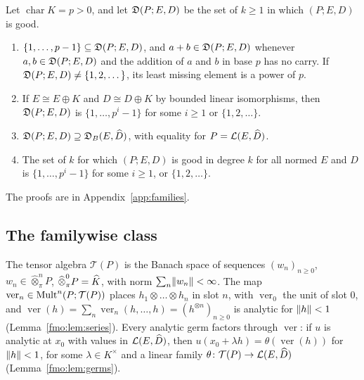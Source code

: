 \begin{corollary}\label{fam2:cor:degrees}
Let $\operatorname{char}K=p>0$, and let $\mathfrak D(P;E,D)$ be the set of $k\ge1$ in which $(P;E,D)$ is good.
\begin{enumerate}
\item $\{1,\dots,p-1\}\subseteq\mathfrak D(P;E,D)$, and $a+b\in\mathfrak D(P;E,D)$ whenever $a,b\in\mathfrak D(P;E,D)$ and the addition of $a$ and
$b$ in base $p$ has no carry. If $\mathfrak D(P;E,D)\ne\{1,2,\dots\}$, its least missing element is a power of $p$.
\item If $E\cong E\oplus K$ and $D\cong D\oplus K$ by bounded linear isomorphisms, then $\mathfrak D(P;E,D)$ is
$\{1,\dots,p^i-1\}$ for some $i\ge1$ or $\{1,2,\dots\}$.
\item $\mathfrak D(P;E,D)\supseteq\mathfrak D_B(E,\widehat D)$, with equality for $P=\mathcal L(E,\widehat D)$.
\item The set of $k$ for which $(P;E,D)$ is good in degree $k$ for all normed $E$ and $D$ is $\{1,\dots,p^i-1\}$ for some
$i\ge1$, or $\{1,2,\dots\}$.
\end{enumerate}
\end{corollary}

The proofs are in Appendix~\ref{app:families}.

\subsection{The familywise class}\label{fam2:ssec:class}

The tensor algebra $\mathcal T(P)$ is the Banach space of sequences $(w_n)_{n\ge0}$, $w_n\in\widehat\otimes^n_\pi P$,
$\widehat\otimes^0_\pi P=\widehat K$, with norm $\sum_n\lVert w_n\rVert<\infty$. The map $\operatorname{ver}_n\in\operatorname{Mult}^n(P;\mathcal T(P))$
places $h_1\otimes\dots\otimes h_n$ in slot $n$, with $\operatorname{ver}_0$ the unit of slot $0$, and
$\operatorname{ver}(h)=\sum_n\operatorname{ver}_n(h,\dots,h)=(h^{\otimes n})_{n\ge0}$ is analytic for $\lVert h\rVert<1$
(Lemma~\ref{fmo:lem:series}). Every analytic germ factors through $\operatorname{ver}$: if $u$ is analytic at $x_0$ with
values in $\mathcal L(E,\widehat D)$, then $u(x_0+\lambda h)=\theta(\operatorname{ver}(h))$ for $\lVert h\rVert<1$, for some
$\lambda\in K^\times$ and a linear family $\theta\colon\mathcal T(P)\to\mathcal L(E,\widehat D)$ (Lemma~\ref{fmo:lem:germs}).

